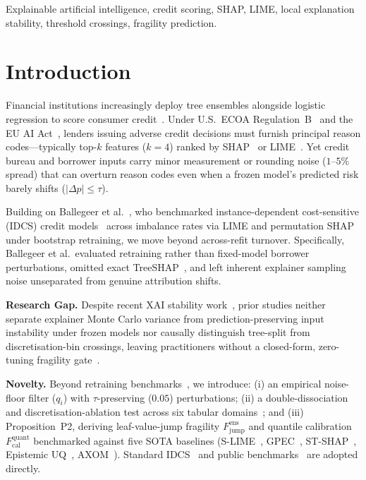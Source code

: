 \documentclass[conference]{IEEEtran}
\begin{document}
\begin{IEEEkeywords}
Explainable artificial intelligence, credit scoring, SHAP, LIME, local explanation stability, threshold crossings, fragility prediction.
\end{IEEEkeywords}

\section{Introduction}
\label{sec:intro}
Financial institutions increasingly deploy tree ensembles alongside logistic regression to score consumer credit~\cite{ballegeer2025,baesens2016}. Under U.S.\ ECOA Regulation~B~\cite{regb_cfpb} and the EU AI Act~\cite{euaiact2024}, lenders issuing adverse credit decisions must furnish principal reason codes—typically top-$k$ features ($k=4$) ranked by SHAP~\cite{lundberg2017,lundberg2020} or LIME~\cite{ribeiro2016}. Yet credit bureau and borrower inputs carry minor measurement or rounding noise ($1$--$5\%$ spread) that can overturn reason codes even when a frozen model's predicted risk barely shifts ($|\Delta p| \le \tau$).

Building on Ballegeer et al.~\cite{ballegeer2025}, who benchmarked instance-dependent cost-sensitive (IDCS) credit models~\cite{bahnsen2014,vanderschueren2022b} across imbalance rates via LIME and permutation SHAP under bootstrap retraining, we move beyond across-refit turnover. Specifically, Ballegeer et al.\ evaluated retraining rather than fixed-model borrower perturbations, omitted exact TreeSHAP~\cite{lundberg2020}, and left inherent explainer sampling noise unseparated from genuine attribution shifts.

\textbf{Research Gap.} Despite recent XAI stability work~\cite{lin2025shap,bhuiyan2026,qi2026}, prior studies neither separate explainer Monte Carlo variance from prediction-preserving input instability under frozen models nor causally distinguish tree-split from discretisation-bin crossings, leaving practitioners without a closed-form, zero-tuning fragility gate~\cite{hill2024,mikriukov2026}.

\textbf{Novelty.} Beyond retraining benchmarks~\cite{ballegeer2025}, we introduce: (i) an empirical noise-floor filter ($q_i$) with $\tau$-preserving ($0.05$) perturbations; (ii) a double-dissociation and discretisation-ablation test across six tabular domains~\cite{vanschoren2014}; and (iii) Proposition~P2, deriving leaf-value-jump fragility $F_{\mathrm{jump}}^{\mathrm{ens}}$ and quantile calibration $F_{\mathrm{cal}}^{\mathrm{quant}}$ benchmarked against five SOTA baselines (S-LIME~\cite{zhou2021}, GPEC~\cite{hill2024}, ST-SHAP~\cite{kelodjou2024}, Epistemic UQ~\cite{mikriukov2026}, AXOM~\cite{pala2024}). Standard IDCS~\cite{ballegeer2025,bahnsen2014} and public benchmarks~\cite{baesens2016,sgcs2019,yeh2009,vanschoren2014} are adopted directly.
\end{document}
